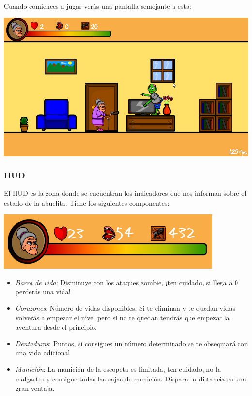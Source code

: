 Cuando comiences a jugar verás una pantalla semejante a esta:

\begin{center}
	\includegraphics[scale=0.35]{screen-juego.png}
\end{center}

\subsubsection{HUD}
El HUD es la zona donde se encuentran los indicadores que nos informan sobre el estado de la abuelita. Tiene los siguientes componentes:

\begin{center}
	\includegraphics[scale=0.35]{hud.png}
\end{center}

\begin{itemize}
	\item \emph{Barra de vida}: Disminuye con los ataques zombie, ¡ten cuidado, si llega a 0 perderás una vida!
	\item \emph{Corazones}: Número de vidas disponibles. Si te eliminan y te quedan vidas volverás a empezar el nivel pero si no te quedan tendrás que empezar la aventura desde el principio.
	\item \emph{Dentaduras}: Puntos, si consigues un número determinado se te obsequiará con una vida adicional
	\item \emph{Munición}: La munición de la escopeta es limitada, ten cuidado, no la malgastes y consigue todas las cajas de munición. Disparar a distancia es una gran ventaja.
\end{itemize}


